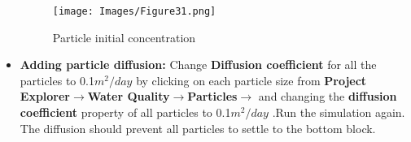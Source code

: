 \begin{itemize}
\begin{figure}[!ht]
\begin{center}
\texttt{[image: Images/Figure31.png]} \\
\caption{Particle initial concentration}\label{fig:31} 
\end{center}
\end{figure}
\item \textbf{Adding particle diffusion: } Change \textbf{Diffusion coefficient} for all the particles to 0.1$m^2/day$ by clicking on each particle size from \textbf{Project Explorer}$\rightarrow$\textbf{Water Quality}$\rightarrow$\textbf{Particles}$\rightarrow$ and changing the \textbf{diffusion coefficient} property of all particles to 0.1$m^2/day$ .Run the simulation again. The diffusion should prevent all particles to settle to the bottom block. 

\end{itemize}